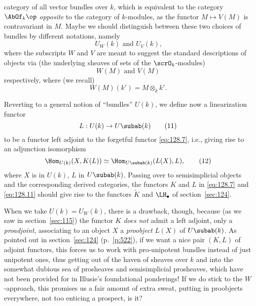 category of all vector bundles over $k$, which is equivalent to the
category $\AbOf_k\op$ \emph{opposite} to the category of $k$-modules,
as the functor $M\mapsto V(M)$ is contravariant in $M$. Maybe we
should distinguish between these two choices of bundles by different
notations, namely
\begin{equation}
  \label{eq:128.9}
  \text{$U_W(k)$ and $U_V(k)$,}\tag{9}
\end{equation}
where the subscripts $W$ and $V$ are meant to suggest the standard
descriptions of objects via (the underlying sheaves of sets of the
$\scrO_k$-modules)
\[\text{$W(M)$ and $V(M)$}\]
respectively, where (we recall)
\begin{equation}
  \label{eq:128.10}
  W(M)(k')=M\otimes_k k'.\tag{10}
\end{equation}

Reverting to a general notion of ``bundles'' $U(k)$, we
define now a linearization functor
\begin{equation}
  \label{eq:128.11}
  L: U(k)\to U\subab(k)\tag{11}
\end{equation}
to be a functor left adjoint to the forgetful functor
\eqref{eq:128.7}, i.e., giving rise to an adjunction isomorphism
\begin{equation}
  \label{eq:128.12}
  \Hom_{U(k)}(X,K(L)) \simeq \Hom_{U\subab(k)}(L(X),L),\tag{12}
\end{equation}
where $X$ is in $U(k)$, $L$ in $U\subab(k)$. Passing over to
semisimplicial objects and the corresponding derived categories, the
functors $K$ and $L$ in \eqref{eq:128.7} and \eqref{eq:128.11} should
give rise to the functors $\widetilde K$ and $\LH_\bullet$ of
section~\ref{sec:124}.

When we take $U(k)=U_W(k)$, there is a drawback, though, because (as
we saw in section~\ref{sec:115}) the functor $K$ \emph{does not} admit
a left adjoint, only a \emph{proadjoint}, associating to an object $X$
a \emph{proobject} $L(X)$ of $U\subab(k)$. As pointed out in
section~\ref{sec:124} (p.~\ref{p:522}), if we want a nice pair $(K,L)$
of adjoint functors, this forces us to work with pro-unipotent bundles
instead of just unipotent ones, thus getting out of the haven of
sheaves over $k$ and into the somewhat dubious sea of prosheaves and
semisimplicial prosheaves, which have not been provided for in
Illusie's foundational ponderings! If we do stick to the $W$-approach,
this promises us a fair amount of extra sweat, putting in proobjects
everywhere, not too enticing a prospect, is it?

